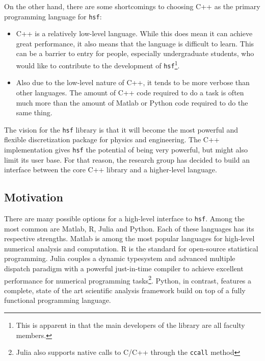     On the other hand, there are some shortcomings to choosing C++ as the primary programming language for \texttt{hsf}:

    \begin{itemize}
      \item  C++ is a relatively low-level language. While this does mean it can achieve great performance, it also means that the language is difficult to learn. This can be a barrier to entry for people, especially undergraduate students, who would like to contribute to the development of \texttt{hsf}\footnote{This is apparent in that the main developers of the library are all faculty members.}.
      \item Also due to the low-level nature of C++, it tends to be more verbose than other languages. The amount of C++ code required to do a task is often much more than the amount of Matlab or Python code required to do the same thing.
    \end{itemize}
    \mainstretch{}

    The vision for the \texttt{hsf} library is that it will become the most powerful and flexible discretization package for physics and engineering. The C++ implementation gives \texttt{hsf} the potential of being very powerful, but might also limit its user base. For that reason, the research group has decided to build an interface between the core C++ library and a higher-level language.

  \subsection{Motivation} \label{ssec:motivation}

    There are many possible options for a high-level interface to \texttt{hsf}. Among the most common are Matlab, R, Julia and Python. Each of these languages has its respective strengths. Matlab is among the most popular languages for high-level numerical analysis and computation. R is the standard for open-source statistical programming. Julia couples a dynamic typesystem and advanced multiple dispatch paradigm with a powerful just-in-time compiler to achieve excellent performance for numerical programming tasks\footnote{Julia also supports native calls to C/C++ through the \texttt{ccall} method}. Python, in contrast, features a complete, state of the art scientific analysis framework build on top of a fully functional programming language.

